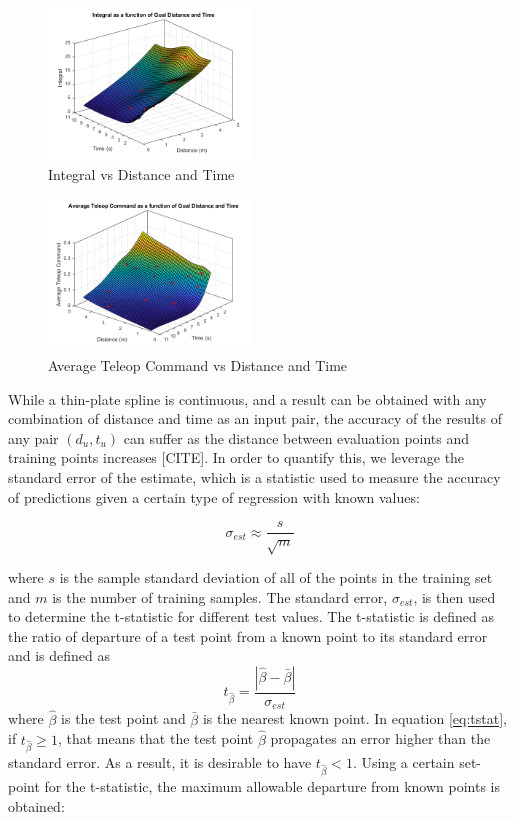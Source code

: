 \documentclass[letterpaper, 10 pt, conference]{ieeeconf}  %
\begin{document}
\begin{figure}[ht]
    \includegraphics[width=0.48\textwidth]{images/integs.png}
    \caption{Integral vs Distance and Time}
    \label{fig:integs}
\end{figure}
\begin{figure}[ht]
    \includegraphics[width=0.48\textwidth]{images/joycmds.png}
    \caption{Average Teleop Command vs Distance and Time}
    \label{fig:joys}
\end{figure}

While a thin-plate spline is continuous, and a result can be obtained with any combination of distance and time as an input pair, the accuracy of the results of any pair $(d_u,t_u)$ can suffer as the distance between evaluation points and training points increases [CITE]. In order to quantify this, we leverage the standard error of the estimate, which is a statistic used to measure the accuracy of predictions given a certain type of regression with known values:

\begin{equation} \label{eq:stderr}
    \sigma_{est} \approx \frac{s}{\sqrt{m}}
\end{equation}

where $s$ is the sample standard deviation of all of the points in the training set and $m$ is the number of training samples. The standard error, $\sigma_{est}$, is then used to determine the t-statistic for different test values. The t-statistic is defined as the ratio of departure of a test point from a known point to its standard error and is defined as
\begin{equation} \label{eq:tstat}
t_{\hat{\beta}} = \frac{|\hat{\beta}-\bar{\beta}|}{\sigma_{est}}    
\end{equation}
where $\hat{\beta}$ is the test point and $\bar{\beta}$ is the nearest known point. In equation \eqref{eq:tstat}, if $t_{\hat{\beta}} \geq 1$, that means that the test point $\hat{\beta}$ propagates an error higher than the standard error. As a result, it is desirable to have $t_{\hat{\beta}} < 1$. Using a certain set-point for the t-statistic, the maximum allowable departure from known points is obtained:
\end{document}
